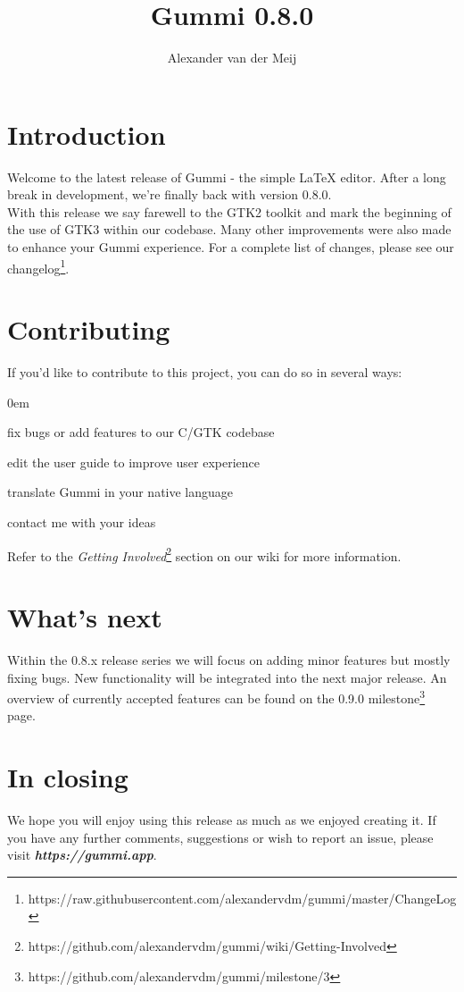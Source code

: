 \documentclass[11pt]{article}
\title{\textbf{Gummi 0.8.0}}
\author{Alexander van der Meij}
\date{}
\begin{document}
\maketitle
\thispagestyle{empty}

\section{Introduction}
Welcome to the latest release of Gummi - the simple {\LaTeX} editor. After a long break in development, we're finally back with version 0.8.0.\\
With this release we say farewell to the GTK2 toolkit and mark the beginning of the use of GTK3 within our codebase. Many other improvements were also made to enhance your Gummi experience. For a complete list of changes, please see our changelog\footnote{https://raw.githubusercontent.com/alexandervdm/gummi/master/ChangeLog}. 

\section{Contributing}
If you'd like to contribute to this project, you can do so in several ways:
\begin{description}
\addtolength{\itemindent}{0.80cm}
\itemsep0em 
\item[Development] fix bugs or add features to our C/GTK codebase
\item[Documentation] edit the user guide to improve user experience
\item[Localization] translate Gummi in your native language
\item[Other] contact me with your ideas
\end{description}
Refer to the \emph{Getting Involved}\footnote{https://github.com/alexandervdm/gummi/wiki/Getting-Involved} section on our wiki for more information. 

\section{What's next}
Within the 0.8.x release series we will focus on adding minor features but mostly fixing bugs. New functionality will be integrated into the next major release. An overview of currently accepted features can be found on the 0.9.0 milestone\footnote{https://github.com/alexandervdm/gummi/milestone/3} page.

\section{In closing}
We hope you will enjoy using this release as much as we enjoyed creating it. If you have any further comments, suggestions or wish to report an issue, please visit \emph{\textbf{https://gummi.app}}. 
\end{document}
